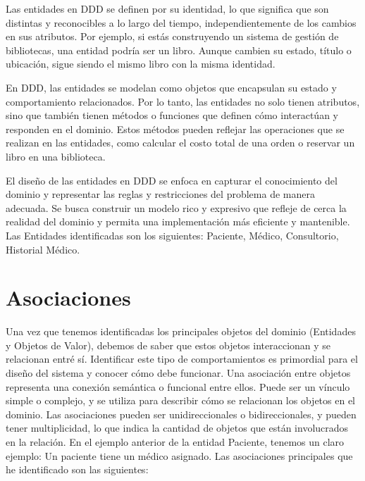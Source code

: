 Las entidades en DDD se definen por su identidad, lo que significa que son distintas y reconocibles a lo largo del tiempo,
independientemente de los cambios en sus atributos. Por ejemplo, si estás construyendo un sistema de gestión de bibliotecas, 
una entidad podría ser un libro. Aunque cambien su estado, título o ubicación, sigue siendo el mismo libro con la misma identidad.

En DDD, las entidades se modelan como objetos que encapsulan su estado y comportamiento relacionados. Por lo tanto, 
las entidades no solo tienen atributos, sino que también tienen métodos o funciones que definen cómo interactúan y 
responden en el dominio. Estos métodos pueden reflejar las operaciones que se realizan en las entidades, como calcular 
el costo total de una orden o reservar un libro en una biblioteca.

El diseño de las entidades en DDD se enfoca en capturar el conocimiento del dominio y representar las reglas y 
restricciones del problema de manera adecuada. Se busca construir un modelo rico y expresivo que refleje de cerca 
la realidad del dominio y permita una implementación más eficiente y mantenible. 
Las Entidades identificadas son los siguientes: Paciente, Médico, Consultorio, Historial Médico.

\section*{Asociaciones}
Una vez que tenemos identificadas los principales objetos del dominio (Entidades y Objetos de Valor), debemos de saber
que estos objetos interaccionan y se relacionan entré sí. Identificar este tipo de comportamientos es primordial para 
el diseño del sistema y conocer cómo debe funcionar. Una asociación entre objetos representa una conexión semántica o funcional entre ellos. 
Puede ser un vínculo simple o complejo, y se utiliza para describir cómo se relacionan los objetos en el dominio.
Las asociaciones pueden ser unidireccionales o bidireccionales, y pueden tener multiplicidad, lo que indica la cantidad 
de objetos que están involucrados en la relación.
En el ejemplo anterior de la entidad Paciente, tenemos un claro ejemplo: Un paciente tiene un médico asignado. 
Las asociaciones principales que he identificado son las siguientes: 


